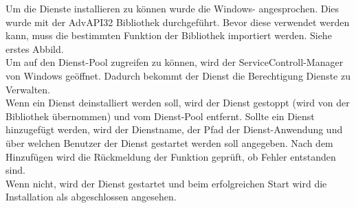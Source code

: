 Um die Dienste installieren zu können wurde die Windows- angesprochen. Dies wurde mit der AdvAPI32 Bibliothek durchgeführt. Bevor diese verwendet werden kann, muss die bestimmten Funktion der Bibliothek importiert werden. Siehe  erstes Abbild. \\
Um auf den Dienst-Pool zugreifen zu können, wird der ServiceControll-Manager von Windows geöffnet. Dadurch bekommt der Dienst die Berechtigung Dienste zu Verwalten. \\
Wenn ein Dienst deinstalliert werden soll, wird der Dienst gestoppt (wird von der Bibliothek übernommen) und vom Dienst-Pool entfernt.
Sollte ein Dienst hinzugefügt werden, wird der Dienstname, der Pfad der Dienst-Anwendung und über welchen Benutzer der Dienst gestartet werden soll angegeben. Nach dem Hinzufügen wird die Rückmeldung der Funktion geprüft, ob Fehler entstanden sind.\\ Wenn nicht, wird der Dienst gestartet und beim erfolgreichen Start wird die Installation als abgeschlossen angesehen.
